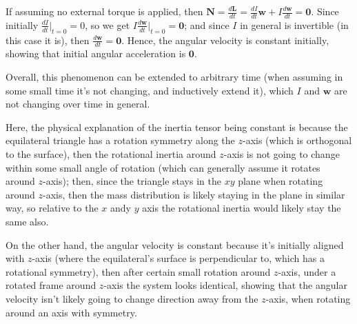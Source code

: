 \documentclass{article}
\newcommand{\bN}{\textbf{N}} %
\newcommand{\bw}{\textbf{w}} %
\newcommand{\bzero}{\textbf{0}}
\begin{document}
If assuming no external torque is applied, then $\bN=\frac{d\textbf{L}}{dt}=\frac{dI}{dt}\bw + I\frac{d\bw}{dt}=\bzero$. Since initially $\frac{dI}{dt}\bigg|_{t=0}=0$, so we get $I\frac{d\bw}{dt}\bigg|_{t=0}=\bzero$; and since $I$ in general is invertible (in this case it is), then $\frac{d\bw}{dt}=\bzero$. Hence, the angular velocity is constant initially, showing that initial angular acceleration is $\bzero$.

Overall, this phenomenon can be extended to arbitrary time (when assuming in some small time it's not changing, and inductively extend it), which $I$ and $\bw$ are not changing over time in general.

\hfil

Here, the physical explanation of the inertia tensor being constant is because the equilateral triangle has a rotation symmetry along the $z$-axis (which is orthogonal to the surface), then the rotational inertia around $z$-axis is not going to change within some small angle of rotation (which can generally assume it rotates around $z$-axis); then, since the triangle stays in the $xy$ plane when rotating around $z$-axis, then the mass distribution is likely staying in the plane in similar way, so relative to the $x$ andy $y$ axis the rotational inertia would likely stay the same also. 

On the other hand, the angular velocity is constant because it's initially aligned with $z$-axis (where the equilateral's surface is perpendicular to, which has a rotational symmetry), then after certain small rotation around $z$-axis, under a rotated frame around $z$-axis the system looks identical, showing that the angular velocity isn't likely going to change direction away from the $z$-axis, when rotating around an axis with symmetry.
\end{document}
